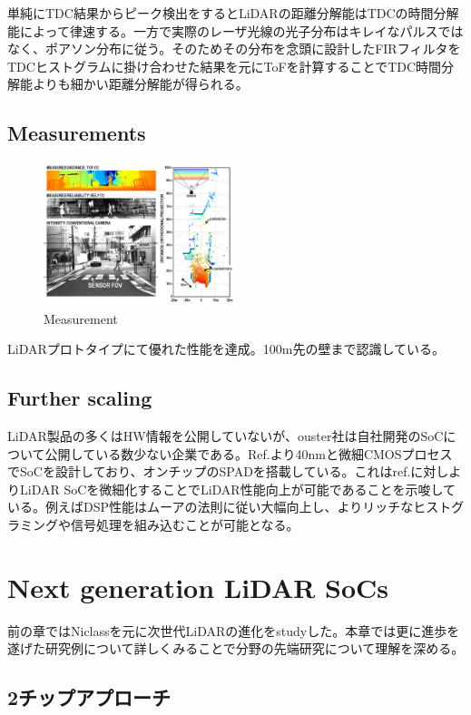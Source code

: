\documentclass[letterpaper, 10 pt, conference]{ieeeconf}  %
\begin{document}
単純にTDC結果からピーク検出をするとLiDARの距離分解能はTDCの時間分解能によって律速する。一方で実際のレーザ光線の光子分布はキレイなパルスではなく、ポアソン分布に従う。そのためその分布を念頭に設計したFIRフィルタをTDCヒストグラムに掛け合わせた結果を元にToFを計算することでTDC時間分解能よりも細かい距離分解能が得られる。

\subsection{Measurements}
\begin{figure}[!t]
\centering
 \includegraphics[width=0.5\textwidth]{figs/distance_image.png}
  \caption{Measurement \cite{niclass2012100}}
\label{meas}
\end{figure}

LiDARプロトタイプにて優れた性能を達成。100m先の壁まで認識している。

\subsection{Further scaling}
LiDAR製品の多くはHW情報を公開していないが、ouster社は自社開発のSoCについて公開している数少ない企業である。Ref.\cite{ouster}より40nmと微細CMOSプロセスでSoCを設計しており、オンチップのSPADを搭載している。これはref.\cite{niclass20130}に対しよりLiDAR SoCを微細化することでLiDAR性能向上が可能であることを示唆している。例えばDSP性能はムーアの法則に従い大幅向上し、よりリッチなヒストグラミングや信号処理を組み込むことが可能となる。

\section{Next generation LiDAR SoCs}
前の章ではNiclassを元に次世代LiDARの進化をstudyした。本章では更に進歩を遂げた研究例について詳しくみることで分野の先端研究について理解を深める。

\subsection{2チップアプローチ}
\end{document}
